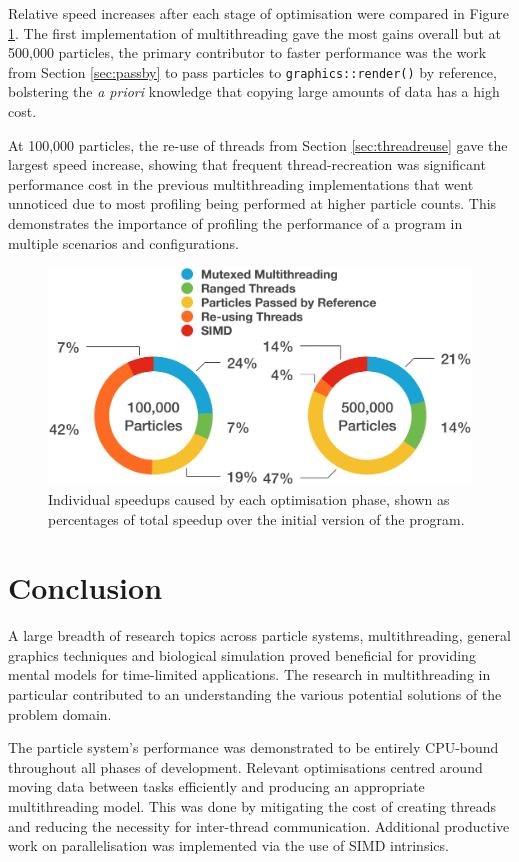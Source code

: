 \documentclass[11pt, a4paper, twocolumn]{article}
\begin{document}
Relative speed increases after each stage of optimisation were compared in Figure \ref{fig:speedup-pies}. The first implementation of multithreading gave the most gains overall but at 500,000 particles, the primary contributor to faster performance was the work from Section \ref{sec:passby} to pass particles to \verb|graphics::render()| by reference, bolstering the \emph{a priori} knowledge that copying large amounts of data has a high cost.

At 100,000 particles, the re-use of threads from Section \ref{sec:threadreuse} gave the largest speed increase, showing that frequent thread-recreation was significant performance cost in the previous multithreading implementations that went unnoticed due to most profiling being performed at higher particle counts. This demonstrates the importance of profiling the performance of a program in multiple scenarios and configurations.

\begin{figure}[h]
\includegraphics[width=\linewidth]{speedup-pies}
\caption{Individual speedups caused by each optimisation phase, shown as percentages of total speedup over the initial version of the program.}
\label{fig:speedup-pies}
\end{figure}

\section{Conclusion}

A large breadth of research topics across particle systems, multithreading, general graphics techniques and biological simulation proved beneficial for providing mental models for time-limited applications. The research in multithreading in particular contributed to an understanding the various potential solutions of the problem domain.

The particle system's performance was demonstrated to be entirely CPU-bound throughout all phases of development. Relevant optimisations centred around moving data between tasks efficiently and producing an appropriate multithreading model. This was done by mitigating the cost of creating threads and reducing the necessity for inter-thread communication. Additional productive work on parallelisation was implemented via the use of SIMD intrinsics.
\end{document}
